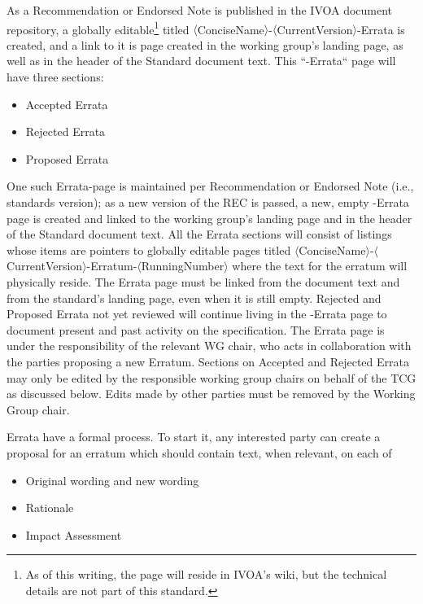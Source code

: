 \documentclass[11pt,a4paper]{ivoa}
\begin{document}
As a Recommendation or Endorsed Note is published
in the IVOA document repository, a
globally editable\footnote{As of this writing, the page will reside in
IVOA's wiki, but the technical details are not part of this standard.}
titled
$\langle$ConciseName$\rangle$-$\langle$CurrentVersion$\rangle$-Errata is
created, and a link to it is page created in the working group's landing
page, as well as in the header of the Standard document text.  This
“-Errata“ page will have three sections:

\begin{itemize}
\item Accepted Errata
\item Rejected Errata
\item Proposed Errata
\end{itemize}

One such Errata-page is maintained per Recommendation or Endorsed Note
(i.e., standards
version); as a new version of the REC is passed, a new, empty -Errata
page is created and linked to the working group’s landing page and in
the header of the Standard document text.  All the Errata sections will
consist of listings whose items are pointers to globally editable pages
titled
$\langle$ConciseName$\rangle$-$\langle$CurrentVersion$\rangle$-Erratum-$\langle$RunningNumber$\rangle$
where the
text for the erratum will physically reside.  The Errata page must be
linked from the document text and from the standard's landing page, even
when it is still empty.  Rejected and Proposed Errata not yet reviewed
will continue living in the -Errata page to document present and past
activity on the specification.  The Errata page is under the
responsibility of the relevant WG chair, who acts in collaboration with
the parties proposing a new Erratum. Sections on Accepted and Rejected
Errata may only be edited by the responsible working group chairs on
behalf of the TCG as discussed below.  Edits made by other parties must
be removed by the Working Group chair.

Errata have a formal process.  To start it, any interested party can
create a proposal for an erratum which should contain text, when
relevant, on each of

\begin{itemize}
\item  Original wording and new wording
\item  Rationale
\item Impact Assessment
\end{itemize}
\end{document}
